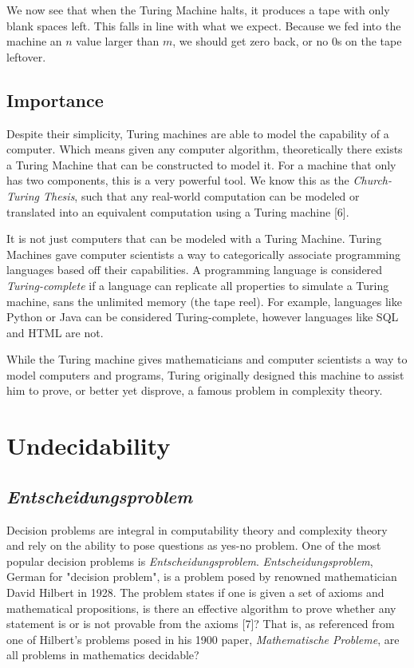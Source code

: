 \documentclass[12pt]{article}
\begin{document}
\noindent We now see that when the Turing Machine halts, it produces a tape with only blank spaces left. This falls in line with what we expect. Because we fed into the machine an $n$ value larger than $m$, we should get zero back, or no $0$s on the tape leftover.


\subsection{Importance}

Despite their simplicity, Turing machines are able to model the capability of a computer. Which means given any computer algorithm, theoretically there exists a Turing Machine that can be constructed to model it. For a machine that only has two components, this is a very powerful tool. We know this as the \textit{Church-Turing Thesis}, such that any real-world computation can be modeled or translated into an equivalent computation using a Turing machine [6].

It is not just computers that can be modeled with a Turing Machine. Turing Machines gave computer scientists a way to categorically associate programming languages based off their capabilities. A programming language is considered \textit{Turing-complete} if a language can replicate all properties to simulate a Turing machine, sans the unlimited memory (the tape reel). For example, languages like Python or Java can be considered Turing-complete, however languages like SQL and HTML are not.

While the Turing machine gives mathematicians and computer scientists a way to model computers and programs, Turing originally designed this machine to assist him to prove, or better yet disprove, a famous problem in complexity theory.


\section{Undecidability}

\subsection{\textit{Entscheidungsproblem}}

Decision problems are integral in computability theory and complexity theory and rely on the ability to pose questions as yes-no problem. One of the most popular decision problems is \textit{Entscheidungsproblem}. \textit{Entscheidungsproblem}, German for "decision problem", is a problem posed by renowned mathematician David Hilbert in 1928. The problem states if one is given a set of axioms and mathematical propositions, is there an effective algorithm to prove whether any statement is or is not provable from the axioms [7]? That is, as referenced from one of Hilbert's problems posed in his 1900 paper, \textit{Mathematische Probleme}, are all problems in mathematics decidable?
\end{document}
